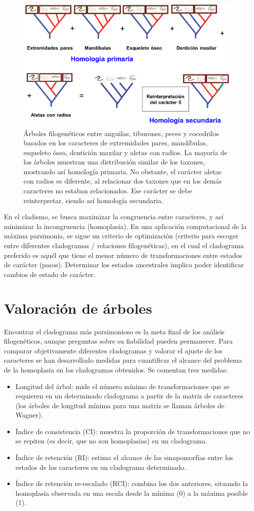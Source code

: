 \begin{figure}[htbp]
\centering
\includegraphics[width=0.5\linewidth]{figs/homologia-primaria-secundaria.png}
\caption{Árboles filogenéticos entre anguilas, tiburones, peces y cocodrilos basados en los caracteres de extremidades pares, mandíbulas, esqueleto óseo, dentición maxilar y aletas con radios. La mayoría de los árboles muestran una distribución similar de los taxones, mostrando así homología primaria. No obstante, el carácter aletas con radios es diferente, al relacionar dos taxones que en los demás caracteres no estaban relacionados. Ese carácter se debe reinterpretar, siendo así homología secundaria.}
\end{figure}

En el cladismo, se busca maximizar la congruencia entre caracteres, y así minimizar la incongruencia (homoplasia). En una aplicación computacional de la máxima parsimonia, se sigue un criterio de optimización (criterio para escoger entre diferentes cladogramas / relaciones filogenéticas), en el cual el cladograma preferido es aquél que tiene el menor número de transformaciones entre estados de carácter (pasos). Determinar los estados ancestrales implica poder identificar cambios de estado de carácter.

\section{Valoración de árboles}
Encontrar el cladograma más parsimonioso es la meta final de los análisis filogenéticos, aunque preguntas sobre su fiabilidad pueden permanecer. Para comparar objetivamente diferentes cladogramas y valorar el ajuste de los caracteres se han desarrollado medidas para cuantificar el alcance del problema de la homoplasia en los cladogramas obtenidos. Se comentan tres medidas: \begin{itemize}
\item Longitud del árbol: mide el número mínimo de transformaciones que se requieren en un determinado cladograma a partir de la matriz de caracteres (los árboles de longitud mínima para una matriz se llaman árboles de Wagner).
\item Índice de consistencia (CI): muestra la proporción de transformaciones que no se repiten (es decir, que no son homoplasias) en un cladograma.
\item Índice de retención (RI): estima el alcance de las sinapomorfías entre los estados de los caracteres en un cladograma determinado.
\item Índice de retención re-escalado (RCI): combina los dos anteriores, situando la homoplasia observada en una escala desde la mínima (0) a la máxima posible (1).
\end{itemize}
